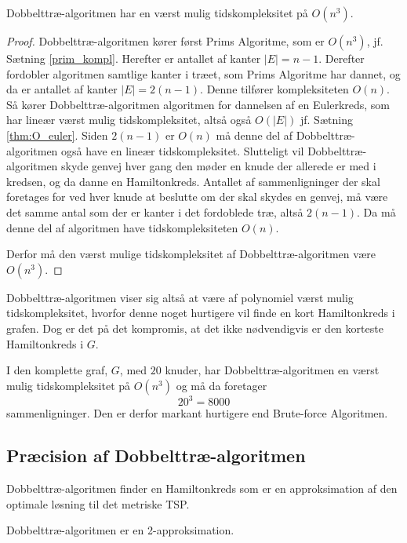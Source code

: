 \begin{thm}
Dobbelttræ-algoritmen har en værst mulig tidskompleksitet på $O(n^3)$.
\end{thm}

\begin{proof}
Dobbelttræ-algoritmen kører først Prims Algoritme, som er $O(n^3)$, jf. Sætning \ref{prim_kompl}. 
Herefter er antallet af kanter $|E|=n-1$.
Derefter fordobler algoritmen samtlige kanter i træet, som Prims Algoritme har dannet, og da er antallet af kanter $|E|=2(n-1)$.
	Denne tilfører kompleksiteten $O(n)$.
	Så kører Dobbelttræ-algoritmen algoritmen for dannelsen af en Eulerkreds, som har lineær værst mulig tidskompleksitet, altså også $O(|E|)$ jf. Sætning \ref{thm:O_euler}. 
Siden $2(n-1)$ er $O(n)$ må denne del af Dobbelttræ-algoritmen også have en lineær tidskompleksitet.
Slutteligt vil Dobbelttræ-algoritmen skyde genvej hver gang den møder en knude der allerede er med i kredsen, og da danne en Hamiltonkreds. Antallet af sammenligninger der skal foretages for ved hver knude at beslutte om der skal skydes en genvej, må være det samme antal som der er kanter i det fordoblede træ, altså $2(n-1)$.
	Da må denne del af algoritmen have tidskompleksiteten $O(n)$.

	Derfor må den værst mulige tidskompleksitet af Dobbelttræ-algoritmen være $O(n^3)$.
\end{proof}

Dobbelttræ-algoritmen viser sig altså at være af polynomiel værst mulig tidskompleksitet, hvorfor denne noget hurtigere vil finde en kort Hamiltonkreds i grafen. Dog er det på det kompromis, at det ikke nødvendigvis er den korteste Hamiltonkreds i $G$.

\begin{exmp}
I den komplette graf, $G$, med $20$ knuder, har Dobbelttræ-algoritmen en værst mulig tidskompleksitet på $O(n^3)$ og må da foretager $$20^3 = 8000$$ sammenligninger. Den er derfor markant hurtigere end Brute-force Algoritmen.
\end{exmp}

\subsection{Præcision af Dobbelttræ-algoritmen}
Dobbelttræ-algoritmen finder en Hamiltonkreds som er en approksimation af den optimale løsning til det metriske TSP.

\begin{thm}
Dobbelttræ-algoritmen er en 2-approksimation.
\end{thm}

